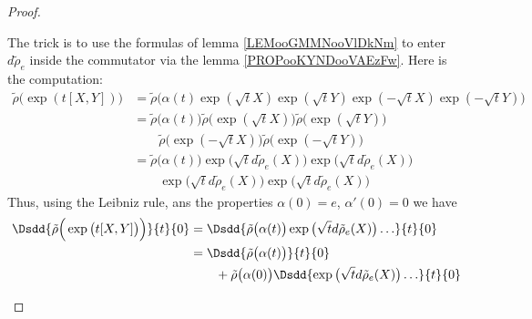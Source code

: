\begin{proof}
\begin{subproof}
		The trick is to use the formulas of lemma \ref{LEMooGMMNooVlDkNm} to enter \( d\tilde \rho_e\) inside the commutator via the lemma \ref{PROPooKYNDooVAEzFw}. Here is the computation:
		\begin{subequations}
			\begin{align}
				\tilde \rho\big( \exp(t[X,Y]) \big) & =\tilde \rho\Big( \alpha(t)\exp(\sqrt{ t }X)\exp(\sqrt{ t }Y)\exp(-\sqrt{ t }X)\exp(-\sqrt{ t }Y) \Big) \\
				                                    & =\tilde \rho\big( \alpha(t) \big) \tilde \rho\big( \exp(\sqrt{ t }X) \big)
				\tilde \rho\big( \exp(\sqrt{ t }Y) \big)                                                                                                      \\\nonumber
				                                    & \qquad\tilde \rho\big( \exp(-\sqrt{ t }X) \big)
				\tilde \rho\big( \exp(-\sqrt{ t }Y) \big)                                                                                                     \\
				                                    & =\tilde \rho\big(\alpha(t)\big)
				\exp\big( \sqrt{ t }d\tilde \rho_e(X) \big)
				\exp\big( \sqrt{ t }d\tilde \rho_e(X) \big)                                                                                                   \\\nonumber
				                                    & \qquad\exp\big( \sqrt{ t }d\tilde \rho_e(X) \big)
				\exp\big( \sqrt{ t }d\tilde \rho_e(X) \big)
			\end{align}
		\end{subequations}
		Thus, using the Leibniz rule, ans the properties \( \alpha(0)=e\), \( \alpha'(0)=0\) we have
		\begin{subequations}
			\begin{align}
				\Dsdd{ \tilde \rho\Big( \exp\big( t[X,Y] \big) \Big) }{t}{0} & =\Dsdd{  \tilde \rho\big( \alpha(t) \big)\exp\big( \sqrt{ t }d\tilde \rho_e(X) \big)\ldots   }{t}{0}                                           \\
				                                                             & =\Dsdd{ \tilde \rho\big( \alpha(t) \big) }{t}{0}                                                                                               \\\nonumber
				                                                             & \qquad+\tilde \rho\big( \alpha(0) \big)\Dsdd{ \exp\big( \sqrt{ t }d\tilde \rho_e(X) \big)\ldots }{t}{0}                                        \\

\end{align}
\end{subequations}
\end{subproof}
\end{proof}
